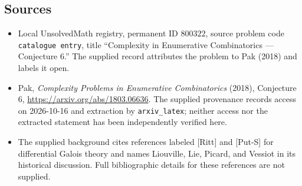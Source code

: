 \documentclass[11pt]{article}
\begin{document}
\subsection{Sources}
\begin{itemize}
\item Local UnsolvedMath registry, permanent ID \(800322\), source problem code \texttt{catalogue entry}, title ``Complexity in Enumerative Combinatorics --- Conjecture 6.'' The supplied record attributes the problem to Pak (2018) and labels it open.
\item Pak, \emph{Complexity Problems in Enumerative Combinatorics} (2018), Conjecture 6, \url{https://arxiv.org/abs/1803.06636}. The supplied provenance records access on 2026-10-16 and extraction by \texttt{arxiv\_latex}; neither access nor the extracted statement has been independently verified here.
\item The supplied background cites references labeled [Ritt] and [Put-S] for differential Galois theory and names Liouville, Lie, Picard, and Vessiot in its historical discussion. Full bibliographic details for these references are not supplied.
\end{itemize}
\end{document}
